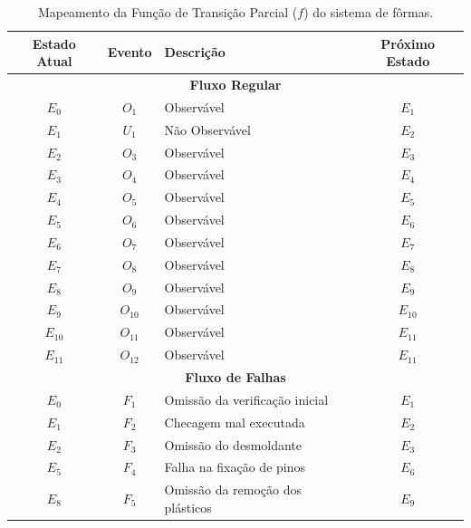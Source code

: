 \begin{table}[htpb]
	\centering
	\caption{Mapeamento da Função de Transição Parcial ($f$) do sistema de fôrmas.}
	\label{tab:funcao_transicao}
	\begin{tabular}{cclc}
		\hline
		\textbf{Estado Atual} & \textbf{Evento} & \textbf{Descrição} & \textbf{Próximo Estado} \\ \hline
		\multicolumn{4}{c}{\textbf{Fluxo Regular}} \\ \hline
		$E_0$ & $O_1$ & Observável & $E_1$ \\
		$E_1$ & $U_1$ & Não Observável & $E_2$ \\
		$E_2$ & $O_3$ & Observável & $E_3$ \\
		$E_3$ & $O_4$ & Observável & $E_4$ \\
		$E_4$ & $O_5$ & Observável & $E_5$ \\
		$E_5$ & $O_6$ & Observável & $E_6$ \\
		$E_6$ & $O_7$ & Observável & $E_7$ \\
		$E_7$ & $O_8$ & Observável & $E_8$ \\
		$E_8$ & $O_9$ & Observável & $E_9$ \\
		$E_9$ & $O_{10}$ & Observável & $E_{10}$ \\
		$E_{10}$ & $O_{11}$ & Observável & $E_{11}$ \\ 
		$E_{11}$ & $O_{12}$ & Observável & $E_{11}$ \\ 
		\hline
		\multicolumn{4}{c}{\textbf{Fluxo de Falhas }} \\ \hline
		$E_0$ & $F_1$ & Omissão da verificação inicial & $E_1$ \\
		$E_1$ & $F_2$ & Checagem mal executada & $E_2$ \\
		$E_2$ & $F_3$ & Omissão do desmoldante & $E_3$ \\
		$E_5$ & $F_4$ & Falha na fixação de pinos & $E_6$ \\
		$E_8$ & $F_5$ & Omissão da remoção dos plásticos & $E_9$ \\ \hline
	\end{tabular}
\end{table}
\FloatBarrier

